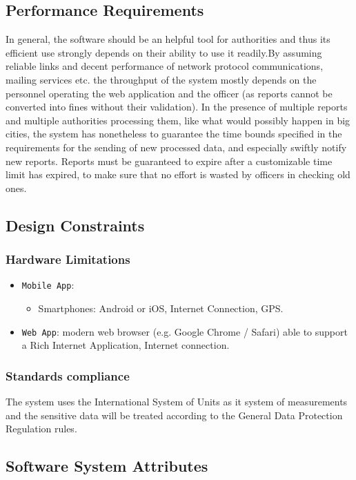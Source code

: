 \documentclass[12pt,a4paper]{article}
\begin{document}
\subsection{Performance	Requirements}
In general, the software should be an helpful tool for authorities and thus its efficient use strongly depends on their ability to use it readily.By assuming reliable links and decent performance of network protocol communications, mailing services etc. the throughput of the system mostly depends on the personnel operating the web application and the officer (as reports cannot be converted into fines without their validation). In the presence of multiple reports and multiple authorities processing them, like what would possibly happen in big cities, the system has nonetheless to guarantee the time bounds specified in the requirements for the sending of new processed data, and especially swiftly notify new reports. Reports must be guaranteed to expire after a customizable time limit has expired, to make sure that no effort is wasted by officers in checking old ones. 
\subsection{Design	Constraints}
\subsubsection{Hardware Limitations}
		\begin{itemize}
			\item \texttt{Mobile App}: 
				\begin{itemize}
					\item Smartphones: Android or iOS, Internet Connection, GPS.
				\end{itemize}
			\item \texttt{Web App}: modern web browser (e.g. Google Chrome / Safari) able to support a Rich Internet Application, Internet connection.
		\end{itemize}
\subsubsection{Standards	compliance}
The system uses the International System of Units as it system of measurements and the sensitive data will be treated according to the General Data Protection Regulation rules.
\subsection{Software	 System	 Attributes} 
\end{document}
